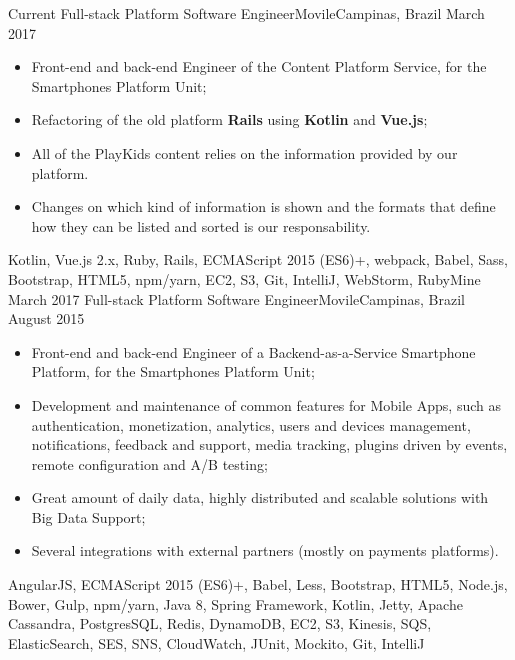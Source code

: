%
%
%

\begin{experiences}
  \experience
    {Current}   {Full-stack Platform Software Engineer}{Movile}{Campinas, Brazil}
    {March 2017} {
    \begin{itemize}
      \item Front-end and back-end Engineer of the Content Platform Service, for the Smartphones Platform Unit;
      \item Refactoring of the old platform \textbf{Rails} using \textbf{Kotlin} and \textbf{Vue.js};
      \item All of the PlayKids content relies on the information provided by our platform.\\
      \item Changes on which kind of information is shown and the formats that define how they can be listed and sorted is our responsability.
    \end{itemize}
  }
  {Kotlin, Vue.js 2.x, Ruby, Rails, ECMAScript 2015 (ES6)+, webpack, Babel, Sass, Bootstrap, HTML5, npm/yarn, EC2, S3, Git, IntelliJ, WebStorm, RubyMine}
  \emptySeparator
  \experience
    {March 2017}   {Full-stack Platform Software Engineer}{Movile}{Campinas, Brazil}
    {August 2015} {
    \begin{itemize}
      \item Front-end and back-end Engineer of a Backend-as-a-Service Smartphone Platform,
      for the Smartphones Platform Unit;
      \item Development and maintenance of common features for Mobile Apps, such as authentication,
      monetization, analytics, users and devices management, notifications, feedback and support,
      media tracking, plugins driven by events, remote configuration and A/B testing;
      \item Great amount of daily data, highly distributed and scalable solutions with Big Data Support;
      \item Several integrations with external partners (mostly on payments platforms).\\
    \end{itemize}
  }
  {AngularJS, ECMAScript 2015 (ES6)+, Babel, Less, Bootstrap, HTML5, Node.js, Bower, Gulp, npm/yarn, Java 8, Spring Framework, Kotlin, Jetty, Apache Cassandra, PostgresSQL, Redis, DynamoDB, EC2, S3, Kinesis, SQS, ElasticSearch, SES, SNS, CloudWatch, JUnit, Mockito, Git, IntelliJ}

\end{experiences}
